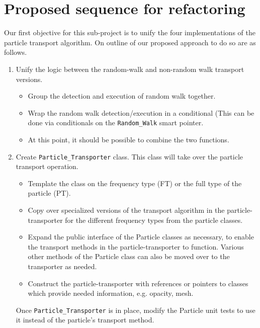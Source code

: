 \documentclass[memo]{ResearchNote}
\begin{document}
\section{Proposed sequence for refactoring}

Our first objective for this sub-project is to unify the four
implementations of the particle transport algorithm. On outline of our
proposed approach to do so are as follows.

\begin{enumerate}
\item Unify the logic between the random-walk and non-random walk
  transport versions. 

  \begin{itemize} 
  \item Group the detection and execution of random walk
    together. 
  \item Wrap the random walk detection/execution in a conditional
    (This can be done via conditionals on the {\tt Random\_Walk} smart
    pointer.
  \item At this point, it should be possible to combine the two
    functions.
  \end{itemize}
  
\item Create {\tt Particle\_Transporter} class. This class will take
  over the particle transport operation.

  \begin{itemize}
  \item Template the class on the frequency type (FT) or the full type
    of the particle (PT).
  \item Copy over specialized versions of the transport algorithm in
    the particle-transporter for the different frequency types from
    the particle classes.
  \item Expand the public interface of the Particle classes as
    necessary, to enable the transport methods in the
    particle-transporter to function. Various other methods of the
    Particle class can also be moved over to the transporter as
    needed.
  \item Construct the particle-transporter with references or pointers
    to classes which provide needed information, e.g. opacity, mesh.
  \end{itemize}

  Once {\tt Particle\_Transporter} is in place, modify the Particle
  unit tests to use it instead of the particle's transport method.
  

\end{enumerate}
\end{document}
